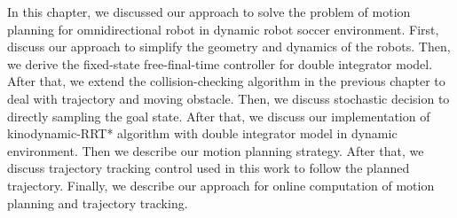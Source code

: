 \documentclass[../thesis.tex]{subfiles}
\begin{document}
In this chapter, we discussed our approach to solve the problem of motion planning for omnidirectional robot in dynamic robot soccer environment. First, discuss our approach to simplify the geometry and dynamics of the robots. Then, we derive the fixed-state free-final-time controller for double integrator model. After that, we extend the collision-checking algorithm in the previous chapter to deal with trajectory and moving obstacle. Then, we discuss stochastic decision to directly sampling the goal state. After that, we discuss our implementation of kinodynamic-RRT* algorithm with double integrator model in dynamic environment. Then we describe our motion planning strategy. After that, we discuss trajectory tracking control used in this work to follow the planned trajectory. Finally, we describe our approach for online computation of motion planning and trajectory tracking.

\section{}
\end{document}
